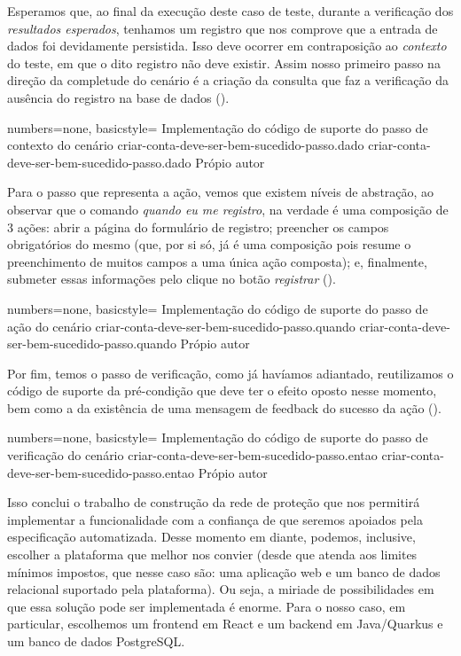   Esperamos que, ao final da execução deste caso de teste, durante a verificação dos \emph{resultados esperados}, tenhamos um registro que nos comprove que a entrada de dados foi devidamente persistida. Isso deve ocorrer em contraposição ao \emph{contexto} do teste, em que o dito registro não deve existir. Assim nosso primeiro passo na direção da completude do cenário é a criação da consulta que faz a verificação da ausência do registro na base de dados ().

  \codigo
    {numbers=none, basicstyle=\ttfamily\tiny}
    {Implementação do código de suporte do passo de contexto do cenário}
    {criar-conta-deve-ser-bem-sucedido-passo.dado}
    {criar-conta-deve-ser-bem-sucedido-passo.dado}
    {Própio autor}

  Para o passo que representa a ação, vemos que existem níveis de abstração, ao observar que o comando \emph{quando eu me registro}, na verdade é uma composição de 3 ações: abrir a página do formulário de registro; preencher os campos obrigatórios do mesmo (que, por si só, já é uma composição pois resume o preenchimento de muitos campos a uma única ação composta); e, finalmente, submeter essas informações pelo clique no botão \emph{registrar} ().

  \codigo
    {numbers=none, basicstyle=\ttfamily\tiny}
    {Implementação do código de suporte do passo de ação do cenário}
    {criar-conta-deve-ser-bem-sucedido-passo.quando}
    {criar-conta-deve-ser-bem-sucedido-passo.quando}
    {Própio autor}

  Por fim, temos o passo de verificação, como já havíamos adiantado, reutilizamos o código de suporte da pré-condição que deve ter o efeito oposto nesse momento, bem como a da existência de uma mensagem de feedback do sucesso da ação ().

  \codigo
    {numbers=none, basicstyle=\ttfamily\tiny}
    {Implementação do código de suporte do passo de verificação do cenário}
    {criar-conta-deve-ser-bem-sucedido-passo.entao}
    {criar-conta-deve-ser-bem-sucedido-passo.entao}
    {Própio autor}

  Isso conclui o trabalho de construção da rede de proteção que nos permitirá implementar a funcionalidade com a confiança de que seremos apoiados pela especificação automatizada. Desse momento em diante, podemos, inclusive, escolher a plataforma que melhor nos convier (desde que atenda aos limites mínimos impostos, que nesse caso são: uma aplicação web e um banco de dados relacional suportado pela plataforma). Ou seja, a miriade de possibilidades em que essa solução pode ser implementada é enorme. Para o nosso caso, em particular, escolhemos um frontend em React e um backend em Java/Quarkus e um banco de dados PostgreSQL.

